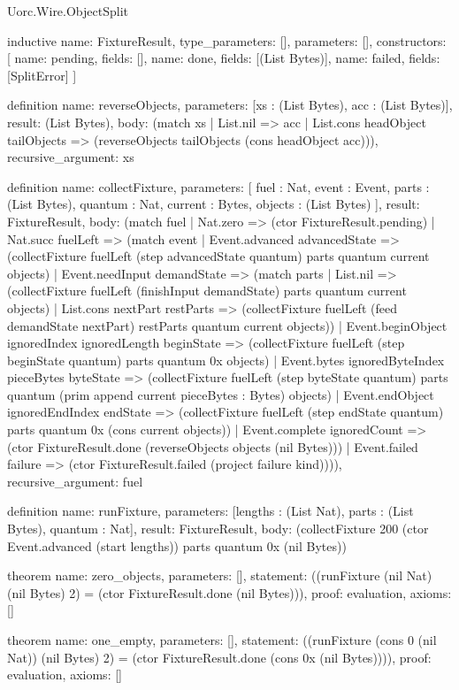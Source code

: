 \begin{lexlean}{Uorc.Wire.ObjectSplit}
\begin{semanticmodule}
inductive{
  name: FixtureResult,
  type_parameters: [],
  parameters: [],
  constructors: [
    {name: pending, fields: []},
    {name: done, fields: [(List Bytes)]},
    {name: failed, fields: [SplitError]}
  ]
}

definition{
  name: reverseObjects,
  parameters: [xs : (List Bytes), acc : (List Bytes)],
  result: (List Bytes),
  body: (match xs
    | List.nil => acc
    | List.cons headObject tailObjects => (reverseObjects tailObjects (cons headObject acc))),
  recursive_argument: xs
}

definition{
  name: collectFixture,
  parameters: [
    fuel : Nat,
    event : Event,
    parts : (List Bytes),
    quantum : Nat,
    current : Bytes,
    objects : (List Bytes)
  ],
  result: FixtureResult,
  body: (match fuel
    | Nat.zero => (ctor FixtureResult.pending)
    | Nat.succ fuelLeft => (match event
      | Event.advanced advancedState => (collectFixture fuelLeft (step advancedState quantum) parts quantum current objects)
      | Event.needInput demandState => (match parts
        | List.nil => (collectFixture fuelLeft (finishInput demandState) parts quantum current objects)
        | List.cons nextPart restParts => (collectFixture fuelLeft (feed demandState nextPart) restParts quantum current objects))
      | Event.beginObject ignoredIndex ignoredLength beginState => (collectFixture fuelLeft (step beginState quantum) parts quantum 0x objects)
      | Event.bytes ignoredByteIndex pieceBytes byteState => (collectFixture fuelLeft (step byteState quantum) parts quantum (prim append current pieceBytes : Bytes) objects)
      | Event.endObject ignoredEndIndex endState => (collectFixture fuelLeft (step endState quantum) parts quantum 0x (cons current objects))
      | Event.complete ignoredCount => (ctor FixtureResult.done (reverseObjects objects (nil Bytes)))
      | Event.failed failure => (ctor FixtureResult.failed (project failure kind)))),
  recursive_argument: fuel
}

definition{
  name: runFixture,
  parameters: [lengths : (List Nat), parts : (List Bytes), quantum : Nat],
  result: FixtureResult,
  body: (collectFixture 200 (ctor Event.advanced (start lengths)) parts quantum 0x (nil Bytes))
}

theorem{
  name: zero_objects,
  parameters: [],
  statement: ((runFixture (nil Nat) (nil Bytes) 2) = (ctor FixtureResult.done (nil Bytes))),
  proof: evaluation{},
  axioms: []
}

theorem{
  name: one_empty,
  parameters: [],
  statement: ((runFixture (cons 0 (nil Nat)) (nil Bytes) 2) = (ctor FixtureResult.done (cons 0x (nil Bytes)))),
  proof: evaluation{},
  axioms: []
}


\end{semanticmodule}
\end{lexlean}
